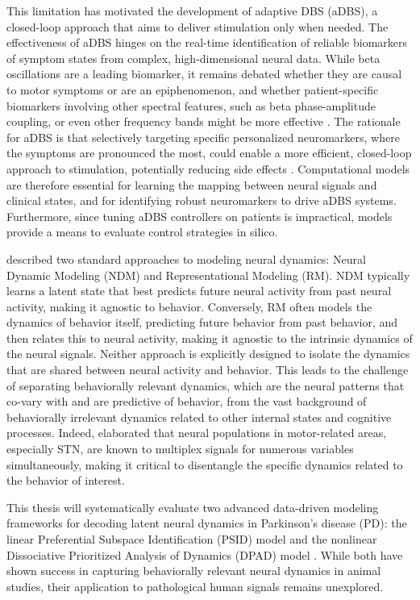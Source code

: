 \documentclass[12pt, a4paper]{article}
\begin{document}
This limitation has motivated the development of adaptive DBS (aDBS), a closed-loop approach that aims to deliver stimulation only when needed. The effectiveness of aDBS hinges on the real-time identification of reliable biomarkers of symptom states from complex, high-dimensional neural data. While beta oscillations are a leading biomarker, it remains debated whether they are causal to motor symptoms or are an epiphenomenon, and whether patient-specific biomarkers involving other spectral features, such as beta phase-amplitude coupling, or even other frequency bands might be more effective \parencite{swannGammaOscillationsHyperkinetic2016, wuComputationalModelsAdvance2024}. The rationale for aDBS is that selectively targeting specific personalized neuromarkers, where the symptoms are pronounced the most, could enable a more efficient, closed-loop approach to stimulation, potentially reducing side effects \parencite{littleAdaptiveDeepBrain2013}. Computational models are therefore essential for learning the mapping between neural signals and clinical states, and for identifying robust neuromarkers to drive aDBS systems. Furthermore, since tuning aDBS controllers on patients is impractical, models provide a means to evaluate control strategies in silico.


\textcite{saniModelingBehaviorallyRelevant2021} described two standard approaches to modeling neural dynamics: Neural Dynamic Modeling (NDM) and Representational Modeling (RM). NDM typically learns a latent state that best predicts future neural activity from past neural activity, making it agnostic to behavior. Conversely, RM often models the dynamics of behavior itself, predicting future behavior from past behavior, and then relates this to neural activity, making it agnostic to the intrinsic dynamics of the neural signals. Neither approach is explicitly designed to isolate the dynamics that are shared between neural activity and behavior. This leads to the challenge of separating behaviorally relevant dynamics, which are the neural patterns that co-vary with and are predictive of behavior, from the vast background of behaviorally irrelevant dynamics related to other internal states and cognitive processes. Indeed, \textcite{wuMixedSelectivitySubthalamic2025} elaborated that neural populations in motor-related areas, especially STN, are known to multiplex signals for numerous variables simultaneously, making it critical to disentangle the specific dynamics related to the behavior of interest.

This thesis will systematically evaluate two advanced data-driven modeling frameworks for decoding latent neural dynamics in Parkinson’s disease (PD): the linear Preferential Subspace Identification (PSID) model \parencite{saniModelingBehaviorallyRelevant2021} and the nonlinear Dissociative Prioritized Analysis of Dynamics (DPAD) model \parencite{saniDissociativePrioritizedModeling2024}. While both have shown success in capturing behaviorally relevant neural dynamics in animal studies, their application to pathological human signals remains unexplored.
\end{document}
